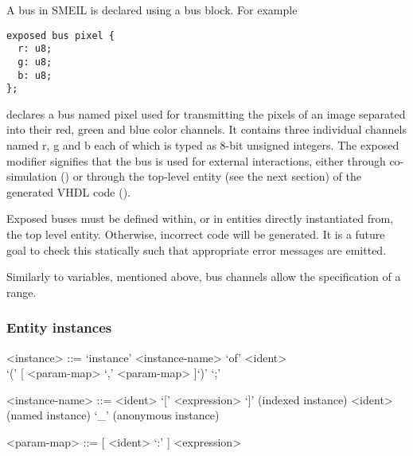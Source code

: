 A bus in SMEIL is declared using a {\ttfamily bus} block. For example
\begin{lstlisting}[language=smeil]
exposed bus pixel {
  r: u8;
  g: u8;
  b: u8;
};
\end{lstlisting}
declares a bus named {\ttfamily pixel} used for transmitting the pixels of an
image separated into their red, green and blue color channels. It contains three
individual channels named {\ttfamily r}, {\ttfamily g} and {\ttfamily b} each of
which is typed as 8-bit unsigned integers. The {\ttfamily exposed} modifier
signifies that the bus is used for external interactions, either through
co-simulation () or through the top-level entity (see the next
section) of the generated VHDL code ().

Exposed buses must be defined within, or in entities directly instantiated from,
the top level entity. Otherwise, incorrect code will be generated. It is a
future goal to check this statically such that appropriate error messages are
emitted.

Similarly to variables, mentioned above, bus channels allow the specification of
a {\ttfamily range}.




\subsubsection{Entity instances}
\label{sec:instance}
\begin{grammar}
  <instance> ::= `instance' <instance-name> `of' <ident> \\`(' [ <param-map> { `,' <param-map> } ]`)' `;'

  <instance-name> ::= <ident> `[' <expression> `]' (indexed instance)
  \alt <ident> (named instance)
  \alt `_' (anonymous instance)

  <param-map> ::= [ <ident> `:' ] <expression>

\end{grammar}


